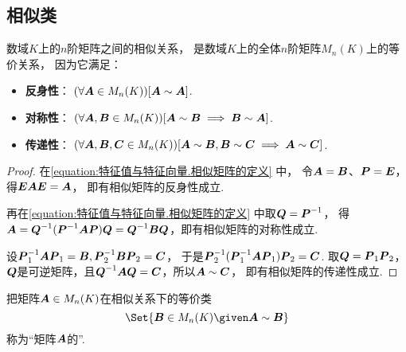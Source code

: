\subsection{相似类}
\begin{property}\label{theorem:特征值与特征向量.相似关系是等价关系}
数域\(K\)上的\(n\)阶矩阵之间的相似关系，
是数域\(K\)上的全体\(n\)阶矩阵\(M_n(K)\)上的等价关系，
因为它满足：\begin{itemize}
	\item {\rm\bf 反身性}：
	\((\forall \boldsymbol{A} \in M_n(K))
	[\boldsymbol{A}\sim\boldsymbol{A}]\).

	\item {\rm\bf 对称性}：
	\((\forall \boldsymbol{A},\boldsymbol{B} \in M_n(K))
	[\boldsymbol{A} \sim \boldsymbol{B} \implies \boldsymbol{B} \sim \boldsymbol{A}]\).

	\item {\rm\bf 传递性}：
	\((\forall \boldsymbol{A},\boldsymbol{B},\boldsymbol{C} \in M_n(K))
	[\boldsymbol{A} \sim \boldsymbol{B}, \boldsymbol{B} \sim \boldsymbol{C} \implies \boldsymbol{A} \sim \boldsymbol{C}]\).
\end{itemize}
\begin{proof}
在\cref{equation:特征值与特征向量.相似矩阵的定义} 中，
令\(\boldsymbol{A}=\boldsymbol{B}\)、\(\boldsymbol{P}=\boldsymbol{E}\)，得\(\boldsymbol{E}\boldsymbol{A}\boldsymbol{E}=\boldsymbol{A}\)，
即有相似矩阵的反身性成立.

再在\cref{equation:特征值与特征向量.相似矩阵的定义} 中取\(\boldsymbol{Q}=\boldsymbol{P}^{-1}\)，
得\(\boldsymbol{A} = \boldsymbol{Q}^{-1}(\boldsymbol{P}^{-1}\boldsymbol{A}\boldsymbol{P})\boldsymbol{Q} = \boldsymbol{Q}^{-1}\boldsymbol{B}\boldsymbol{Q}\)，即有相似矩阵的对称性成立.

设\(\boldsymbol{P}_1^{-1}\boldsymbol{A}\boldsymbol{P}_1=\boldsymbol{B},
\boldsymbol{P}_2^{-1}\boldsymbol{B}\boldsymbol{P}_2=\boldsymbol{C}\)，
于是\(\boldsymbol{P}_2^{-1}(\boldsymbol{P}_1^{-1}\boldsymbol{A}\boldsymbol{P}_1)\boldsymbol{P}_2=\boldsymbol{C}\).
取\(\boldsymbol{Q}=\boldsymbol{P}_1\boldsymbol{P}_2\)，\(\boldsymbol{Q}\)是可逆矩阵，且\(\boldsymbol{Q}^{-1}\boldsymbol{A}\boldsymbol{Q}=\boldsymbol{C}\)，所以\(\boldsymbol{A}\sim\boldsymbol{C}\)，
即有相似矩阵的传递性成立.
\end{proof}
\end{property}

\begin{definition}
把矩阵\(\boldsymbol{A} \in M_n(K)\)在相似关系下的等价类\begin{equation*}
	\Set{ \vb{B} \in M_n(K) \given \vb{A}\sim\vb{B} }
\end{equation*}称为“矩阵\(\boldsymbol{A}\)的”.
\end{definition}

